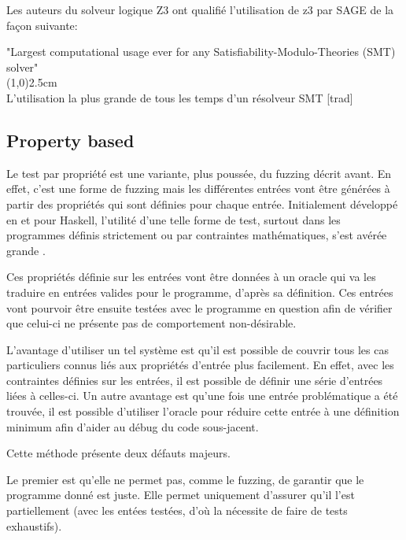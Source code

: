 \documentclass[a4paper]{report}
\begin{document}
Les auteurs du solveur logique Z3 ont qualifié l'utilisation de z3 par SAGE de la façon suivante:
\begin{center}
"Largest computational usage ever for any Satisfiability-Modulo-Theories (SMT) solver" \cite{moura2008z3}\\
\line(1,0){2.5cm}$ $ \\
L'utilisation la plus grande de tous les temps d'un résolveur SMT [trad] 
\end{center}

\subsection{Property based}

Le test par propriété est une variante, plus poussée, du fuzzing décrit avant.
En effet, c'est une forme de fuzzing mais les différentes entrées vont être générées à partir des propriétés qui sont définies pour chaque entrée.
Initialement développé en et pour Haskell, l'utilité d'une telle forme de test, surtout dans les programmes définis strictement ou par contraintes mathématiques, s'est avérée grande \cite{Paraskevopoulou2015}.

Ces propriétés définie sur les entrées vont être données à un oracle qui va les traduire en entrées valides pour le programme, d'après sa définition.
Ces entrées vont pourvoir être ensuite testées avec le programme en question afin de vérifier que celui-ci ne présente pas de comportement non-désirable\cite{Fink1997}.

L'avantage d'utiliser un tel système est qu'il est possible de couvrir tous les cas particuliers connus liés aux propriétés d'entrée plus facilement.
En effet, avec les contraintes définies sur les entrées, il est possible de définir une série d'entrées liées à celles-ci.
Un autre avantage est qu'une fois une entrée problématique a été trouvée, il est possible d'utiliser l'oracle pour réduire cette entrée à une définition minimum afin d'aider au débug du code sous-jacent\cite{Papadakis2011}.

Cette méthode présente deux défauts majeurs.

Le premier est qu'elle ne permet pas, comme le fuzzing, de garantir que le programme donné est juste.
Elle permet uniquement d'assurer qu'il l'est partiellement (avec les entées testées, d'où la nécessite de faire de tests exhaustifs)\cite{Papadakis2011}.
\end{document}

